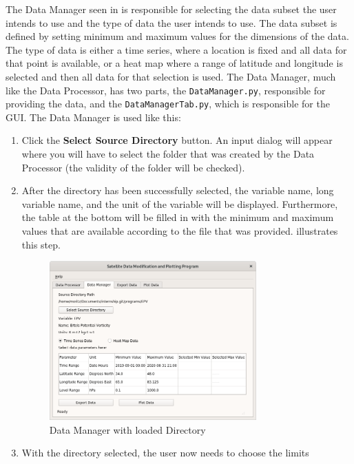 \documentclass[../00_main.tex]{subfiles}
\begin{document}
The Data Manager seen in  is responsible for selecting the data 
subset the user intends to use and the type of data the user intends to use.
The data subset is defined by setting minimum and maximum values for the
dimensions of the data. The type of data is either a time series, where
a location is fixed and all data for that point is available, or a heat map
where a range of latitude and longitude is selected and then all data for that
selection is used. The Data Manager, much like the Data Processor, has two
parts, the \texttt{DataManager.py}, responsible for providing the data, and the
\texttt{DataManagerTab.py}, which is responsible for the GUI. The Data Manager
is used like this:
\begin{enumerate}
    \item Click the \textbf{Select Source Directory} button. An input dialog
        will appear where you will have to select the folder that was created
        by the Data Processor (the validity of the folder will be checked).
    \item After the directory has been successfully selected, the variable
        name, long variable name, and the unit of the variable will be
        displayed. Furthermore, the table at the bottom will be filled in with
        the minimum and maximum values that are available according to the file
        that was provided.  illustrates this step.
        \begin{figure}[H]
            \center
            \includegraphics[width=0.75\textwidth]{../graphics/dm02}
            \caption{Data Manager with loaded Directory}
            \label{dm02}
        \end{figure}
    \item With the directory selected, the user now needs to choose the limits

\end{enumerate}
\end{document}

